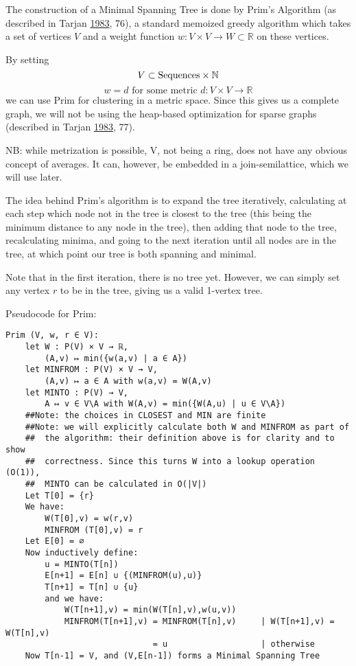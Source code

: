\documentclass[fleqn]{book}
\begin{document}
The construction of a Minimal Spanning Tree is done by Prim's Algorithm
(as described in Tarjan \protect\hyperlink{ref-tarjan1983}{1983}, 76), a
standard memoized greedy algorithm which takes a set of vertices \(V\)
and a weight function \(w: V \times V \rightarrow W \subset \mathbb{R}\)
on these vertices.

By setting \[V \subset \text{Sequences} \times \mathbb{N}\]
\[w = d\text{ for some metric }d : V \times V \rightarrow ℝ\] we can use
Prim for clustering in a metric space. Since this gives us a complete
graph, we will not be using the heap-based optimization for sparse
graphs (described in Tarjan \protect\hyperlink{ref-tarjan1983}{1983},
77).

NB: while metrization is possible, V, not being a ring, does not have
any obvious concept of averages. It can, however, be embedded in a
join-semilattice, which we will use later.

The idea behind Prim's algorithm is to expand the tree iteratively,
calculating at each step which node not in the tree is closest to the
tree (this being the minimum distance to any node in the tree), then
adding that node to the tree, recalculating minima, and going to the
next iteration until all nodes are in the tree, at which point our tree
is both spanning and minimal.

Note that in the first iteration, there is no tree yet. However, we can
simply set any vertex \(r\) to be in the tree, giving us a valid
1-vertex tree.

Pseudocode for Prim:

\begin{verbatim}
Prim (V, w, r ∈ V):
    let W : P(V) × V → ℝ,
        (A,v) ↦ min({w(a,v) | a ∈ A})
    let MINFROM : P(V) × V → V,
        (A,v) ↦ a ∈ A with w(a,v) = W(A,v)
    let MINTO : P(V) → V,
        A ↦ v ∈ V\A with W(A,v) = min({W(A,u) | u ∈ V\A})
    ##Note: the choices in CLOSEST and MIN are finite
    ##Note: we will explicitly calculate both W and MINFROM as part of
    ##  the algorithm: their definition above is for clarity and to show
    ##  correctness. Since this turns W into a lookup operation (O(1)),
    ##  MINTO can be calculated in O(|V|)
    Let T[0] = {r}
    We have:
        W(T[0],v) = w(r,v)
        MINFROM (T[0],v) = r
    Let E[0] = ∅
    Now inductively define:
        u = MINTO(T[n])
        E[n+1] = E[n] ∪ {(MINFROM(u),u)}
        T[n+1] = T[n] ∪ {u}
        and we have:
            W(T[n+1],v) = min(W(T[n],v),w(u,v))
            MINFROM(T[n+1],v) = MINFROM(T[n],v)     | W(T[n+1],v) = W(T[n],v)
                              = u                   | otherwise
    Now T[n-1] = V, and (V,E[n-1]) forms a Minimal Spanning Tree
\end{verbatim}
\end{document}
